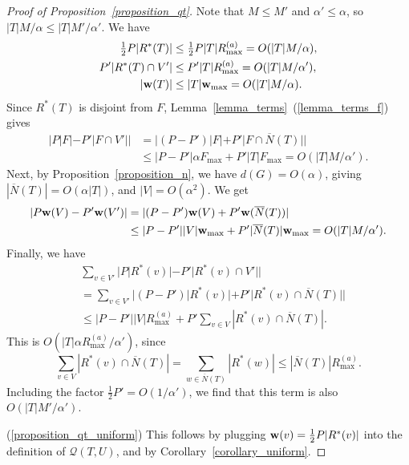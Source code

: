 \documentclass{article}
\theoremstyle{plain}
\theoremstyle{remark}
\theoremstyle{plain}
\numberwithin{equation}{section}
\renewcommand{\b}{{\bf{w}}}
\begin{document}
\begin{proof}[Proof of Proposition~\ref{proposition_qt}]
		Note that $M\leq M'$ and $\alpha'\leq\alpha$, so $|T|M/\alpha\leq|T|M'/\alpha'$. We have
		\begin{align}
			\tfrac12P|R^*(T)|&\leq\tfrac12P|T|R_{\max}^{(a)}=O(|T|M/\alpha),
			\\P'|R^*(T)\cap V'|&\leq P'|T|R_{\max}^{(a)}=O(|T|M/\alpha'),\\|\b(T)|&\leq|T|\b_{\max}=O(|T|M/\alpha).
		\end{align}
		Since $R^*(T)$ is disjoint from $F$, Lemma~\ref{lemma_terms}~(\ref{lemma_terms_f}) gives
		\begin{align}
			|P|F|-P'|F\cap V'||
			&=|(P-P')|F|+P'|F\cap\overline{N}(T)||
			\\&\leq|P-P'|\alpha F_{\max}+P'|T|F_{\max}=O(|T|M/\alpha').
		\end{align}
		Next, by Proposition~\ref{proposition_n}, we have $d(G)=O(\alpha)$, giving $|\overline{N}(T)|=O(\alpha|T|)$, and $|V|=O(\alpha^2)$. We get
		\begin{align}
			|P\b(V)-P'\b(V')|
			&=|(P-P')\b(V)+P'\b(\overline{N}(T))|
			\\&\leq|P-P'||V|\b_{\max}+P'|\overline{N}(T)|\b_{\max}=O(|T|M/\alpha').
		\end{align}
		Finally, we have
		\begin{align}
			&\sum_{v\in V'}|P|R^*(v)|-P'|R^*(v)\cap V'||
			\\&=\sum_{v\in V'}|(P-P')|R^*(v)|+P'|R^*(v)\cap\overline{N}(T)||
			\\&\leq|P-P'||V|R_{\max}^{(a)}+P'\sum_{v\in V}|R^*(v)\cap\overline{N}(T)|.
		\end{align}
		This is $O(|T|\alpha R_{\max}^{(a)}/\alpha')$, since $$\sum_{v\in V}|R^*(v)\cap\overline{N}(T)|=\sum_{w\in\overline{N}(T)}|R^*(w)|\leq|\overline{N}(T)|R_{\max}^{(a)}.$$ Including the factor $\frac12P'=O(1/\alpha')$, we find that this term is also $O(|T|M'/\alpha')$.
		
		(\ref{proposition_qt_uniform}) This follows by plugging $\b(v)=\frac12P|R^*(v)|$ into the definition of $\mathscr{Q}(T,U)$, and by Corollary~\ref{corollary_uniform}.
	\end{proof}
	
\end{document}
